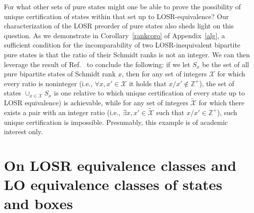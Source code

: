 \documentclass[12pt]{article}
\newcommand{\rob}{\color{black}}
\newcommand{\blk}{\color{black}}
\theoremstyle{plain}
\theoremstyle{definition}
\begin{document}
\begin{appendices}
For what other sets of pure states might one be able to prove the possibility of unique certification of states within that set up to LOSR-equivalence?  Our characterization of the LOSR preorder of pure states also sheds light on this question.   
As we demonstrate in Corollary~\ref{rankcoro} of Appendix~\ref{alg}, 
a sufficient condition for the incomparability of two LOSR-inequivalent bipartite pure states is that the ratio of their Schmidt ranks is not an integer.
We can then leverage the result of Ref.~\cite{Coladangelo2017} to conclude the following:
 if we let $S_x$ be the set of all pure bipartite states of Schmidt rank $x$, then for any set of integers $\mathcal{X}$ for which every ratio is noninteger
  (i.e., $\forall x,x'\in \mathcal{X}$ it holds that $x/x' \not\in \mathbb{Z}^{+}$), the set of states $\cup_{x \in \mathcal{X}} S_x$  
is one relative to which unique certification of every state  up to LOSR equivalence) is achievable,
 while for any set of integers $\tilde{\mathcal{X}}$ for which there exists a pair with an integer ratio 
 (i.e., $\exists x,x'\in \tilde{\mathcal{X}}$ such that $x/x' \in \mathbb{Z}^{+}$), such unique certification is impossible. \rob Presumably, this example is of academic interest only.  \blk


\section{On LOSR equivalence classes and LO equivalence classes of states and boxes}
\label{discrepanciesLOSRLO}


\end{appendices}
\end{document}
